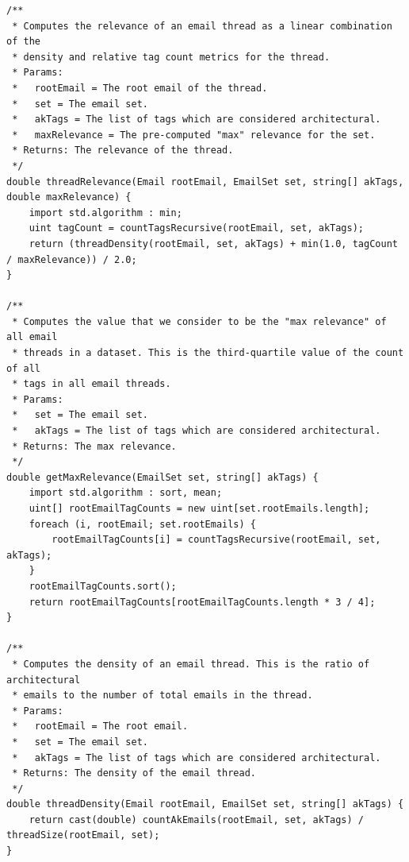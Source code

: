 \documentclass[a4paper, 12pt]{article}
\begin{document}
			\begin{verbatim}
/** 
 * Computes the relevance of an email thread as a linear combination of the
 * density and relative tag count metrics for the thread.
 * Params:
 *   rootEmail = The root email of the thread.
 *   set = The email set.
 *   akTags = The list of tags which are considered architectural.
 *   maxRelevance = The pre-computed "max" relevance for the set.
 * Returns: The relevance of the thread.
 */
double threadRelevance(Email rootEmail, EmailSet set, string[] akTags, double maxRelevance) {
	import std.algorithm : min;
	uint tagCount = countTagsRecursive(rootEmail, set, akTags);
	return (threadDensity(rootEmail, set, akTags) + min(1.0, tagCount / maxRelevance)) / 2.0;
}

/** 
 * Computes the value that we consider to be the "max relevance" of all email
 * threads in a dataset. This is the third-quartile value of the count of all
 * tags in all email threads.
 * Params:
 *   set = The email set.
 *   akTags = The list of tags which are considered architectural.
 * Returns: The max relevance.
 */
double getMaxRelevance(EmailSet set, string[] akTags) {
	import std.algorithm : sort, mean;
	uint[] rootEmailTagCounts = new uint[set.rootEmails.length];
	foreach (i, rootEmail; set.rootEmails) {
		rootEmailTagCounts[i] = countTagsRecursive(rootEmail, set, akTags);
	}
	rootEmailTagCounts.sort();
	return rootEmailTagCounts[rootEmailTagCounts.length * 3 / 4];
}

/** 
 * Computes the density of an email thread. This is the ratio of architectural
 * emails to the number of total emails in the thread.
 * Params:
 *   rootEmail = The root email.
 *   set = The email set.
 *   akTags = The list of tags which are considered architectural.
 * Returns: The density of the email thread.
 */
double threadDensity(Email rootEmail, EmailSet set, string[] akTags) {
	return cast(double) countAkEmails(rootEmail, set, akTags) / threadSize(rootEmail, set);
}	
			\end{verbatim}
\end{document}
